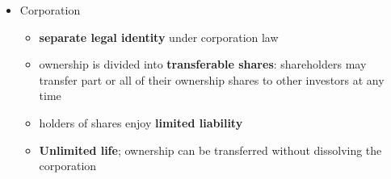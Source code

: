 \documentclass{article}
\begin{document}
\begin{multicols}{2}
\begin{itemize}
\begin{itemize}
\begin{itemize}
		\end{itemize}
		\item Corporation
		\begin{itemize}
			\item \textbf{separate legal identity} under corporation law
			\item ownership is divided into \textbf{transferable shares}: shareholders may transfer part or all of their ownership shares to other investors at any time
			\item holders of shares enjoy \textbf{limited liability}
			\item \textbf{Unlimited life}; ownership can be transferred without dissolving the corporation
		\end{itemize}
	\end{itemize}
\end{itemize}


\end{multicols}
\end{document}
